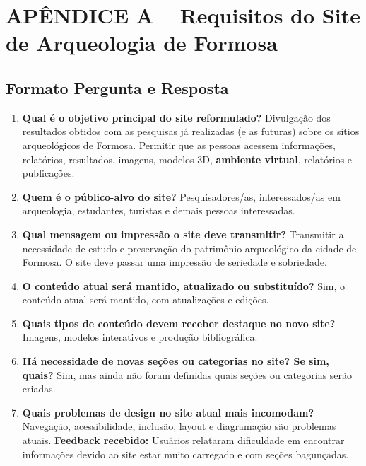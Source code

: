 \section*{APÊNDICE A -- Requisitos do Site de Arqueologia de Formosa}

\subsection*{Formato Pergunta e Resposta}

\begin{enumerate}
    \item \textbf{Qual é o objetivo principal do site reformulado?}  
    Divulgação dos resultados obtidos com as pesquisas já realizadas (e as futuras) sobre os sítios arqueológicos de Formosa.  
    Permitir que as pessoas acessem informações, relatórios, resultados, imagens, modelos 3D, \textbf{ambiente virtual}, relatórios e publicações.

    \item \textbf{Quem é o público-alvo do site?}  
    Pesquisadores/as, interessados/as em arqueologia, estudantes, turistas e demais pessoas interessadas.

    \item \textbf{Qual mensagem ou impressão o site deve transmitir?}  
    Transmitir a necessidade de estudo e preservação do patrimônio arqueológico da cidade de Formosa.  
    O site deve passar uma impressão de seriedade e sobriedade.

    \item \textbf{O conteúdo atual será mantido, atualizado ou substituído?}  
    Sim, o conteúdo atual será mantido, com atualizações e edições.

    \item \textbf{Quais tipos de conteúdo devem receber destaque no novo site?}  
    Imagens, modelos interativos e produção bibliográfica.

    \item \textbf{Há necessidade de novas seções ou categorias no site? Se sim, quais?}  
    Sim, mas ainda não foram definidas quais seções ou categorias serão criadas.

    \item \textbf{Quais problemas de design no site atual mais incomodam?}  
    Navegação, acessibilidade, inclusão, layout e diagramação são problemas atuais.  
    \textbf{Feedback recebido:} Usuários relataram dificuldade em encontrar informações devido ao site estar muito carregado e com seções bagunçadas.


\end{enumerate}
